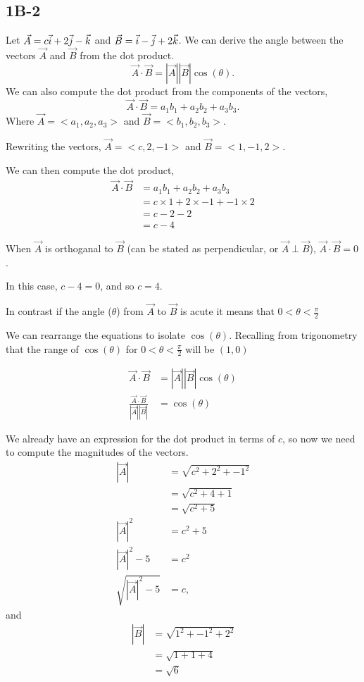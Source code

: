 \documentclass[main.tex]{subfiles}
\begin{document}
\subsection*{1B-2}

Let $\vec{A} = c\vec{i} + 2\vec{j} - \vec{k}$ and $\vec{B} = \vec{i} - \vec{j} + 2\vec{k}$.
We can derive the angle between the vectors $\vec{A}$ and $\vec{B}$ from the dot
product. \[\vec{A}\cdot\vec{B} = |\vec{A}||\vec{B}|\cos(\theta).\]
We can also compute the dot product from the components of the vectors,
\[\vec{A}\cdot\vec{B} = a_1 b_1 + a_2 b_2 + a_3 b_3.\]
Where $\vec{A} = <a_1, a_2, a_3>$ and $\vec{B} = <b_1, b_2, b_3>$.

Rewriting the vectors, $\vec{A} = <c, 2, -1>$ and $\vec{B} = <1, -1, 2>$.

We can then compute the dot product, 
\begin{align*}
\vec{A}\cdot\vec{B} &= a_1 b_1 + a_2 b_2 + a_3 b_3\\
                    &= c\times1 + 2\times-1 + -1\times2\\
                    &= c - 2 - 2\\
                    &= c - 4
\end{align*}

When $\vec{A}$ is orthoganal to $\vec{B}$ (can be stated as perpendicular, 
or $\vec{A}\perp\vec{B}$), $\vec{A}\cdot\vec{B} = 0$.

In this case, $c-4 = 0$, and so $c = 4$.

In contrast if the angle ($\theta$) from $\vec{A}$ to $\vec{B}$ is acute it 
means that $0 < \theta < \frac{\pi}{2}$

We can rearrange the equations to isolate $\cos(\theta)$. Recalling from 
trigonometry that the range of $\cos(\theta)$ for  
$0 < \theta < \frac{\pi}{2}$ will  be $(1, 0)$


\begin{align*}
\vec{A}\cdot\vec{B} &= |\vec{A}||\vec{B}|\cos(\theta)\\
\frac{\vec{A}\cdot\vec{B}}{|\vec{A}||\vec{B}|} &= \cos(\theta)
\end{align*}

We already have an expression for the dot product in terms of $c$, so now 
we need to compute the magnitudes of the vectors.
\begin{align*}
|\vec{A}| &= \sqrt{c^2 + 2^2 + -1^2}\\
          &= \sqrt{c^2 + 4 + 1}\\
          &= \sqrt{c^2 + 5}\\
|\vec{A}|^2 &= c^2 + 5\\
|\vec{A}|^2 - 5 &= c^2\\
\sqrt{|\vec{A}|^2 - 5} &= c,
\end{align*}
and
\begin{align*}
|\vec{B}| &= \sqrt{1^2 + -1^2 + 2^2}\\
          &= \sqrt{1 + 1 + 4}\\
          &= \sqrt6
\end{align*}
\end{document}
